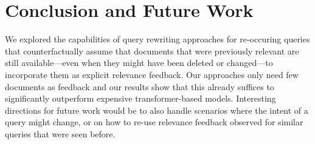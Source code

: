 \section{Conclusion and Future Work}

We explored the capabilities of query rewriting approaches for re-occuring queries that counterfactually assume that documents that were previously relevant are still available---even when they might have been deleted or changed---to incorporate them as explicit relevance feedback. Our approaches only need few documents as feedback and our results show that this already suffices to significantly outperform expensive transformer-based models. Interesting directions for future work would be to also handle scenarios where the intent of a query might change, or on how to re-use relevance feedback observed for similar queries that were seen before.
